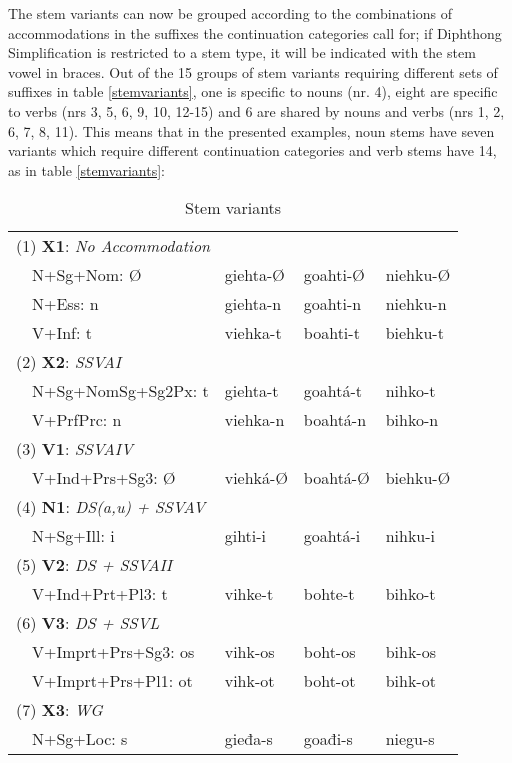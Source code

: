 \documentclass[a4paper,english]{article}
\begin{document}
The stem variants can now be grouped according to the combinations of accommodations in the suffixes the continuation categories call for; if Diphthong Simplification is restricted to a stem type, it will be indicated with the stem vowel in braces. Out of the 15 groups of stem variants requiring different sets of suffixes in  table \ref{stemvariants}, one is specific to nouns (nr. 4), eight are specific to verbs (nrs 3, 5, 6, 9, 10, 12-15) and 6 are shared by nouns and verbs (nrs 1, 2, 6, 7, 8, 11). This means that in the presented examples, noun stems have seven variants which require different continuation categories and verb stems have 14, as in table \ref{stemvariants}:

\begin{table}[htdp]
\caption{Stem variants}
\begin{center}
\begin{tabular}{lllll}
\multicolumn{4}{l}{(1) \textbf{X1}: \textit{No Accommodation}}\\ 
  & N+Sg+Nom: Ø & giehta-Ø & goahti-Ø & niehku-Ø\\ 
  & N+Ess: n & giehta-n & goahti-n & niehku-n\\ 
  & V+Inf: t & viehka-t & boahti-t & biehku-t\\ 
\multicolumn{4}{l}{(2) \textbf{X2}: \textit{SSVAI}}\\ 
  & N+Sg+NomSg+Sg2Px: t & giehta-t & goahtá-t & nihko-t\\ 
  & V+PrfPrc: n & viehka-n & boahtá-n & bihko-n\\ 
\multicolumn{4}{l}{(3) \textbf{V1}: \textit{SSVAIV}}\\ 
  & V+Ind+Prs+Sg3: Ø & viehká-Ø & boahtá-Ø & biehku-Ø\\ 
\multicolumn{4}{l}{(4) \textbf{N1}: \textit{DS(a,u) + SSVAV}}\\ 
  & N+Sg+Ill: i & gihti-i & goahtá-i & nihku-i\\ 
\multicolumn{4}{l}{(5) \textbf{V2}: \textit{DS + SSVAII}}\\ 
  & V+Ind+Prt+Pl3: t & vihke-t & bohte-t & bihko-t\\ 
\multicolumn{4}{l}{(6) \textbf{V3}: \textit{DS + SSVL}}\\ 
  & V+Imprt+Prs+Sg3: os & vihk-os & boht-os & bihk-os\\ 
  & V+Imprt+Prs+Pl1: ot & vihk-ot & boht-ot & bihk-ot\\ 
\multicolumn{4}{l}{(7) \textbf{X3}: \textit{WG}}\\ 
  & N+Sg+Loc: s & gieđa-s & goađi-s & niegu-s\\ 

\end{tabular}
\end{center}
\end{table}
\end{document}
